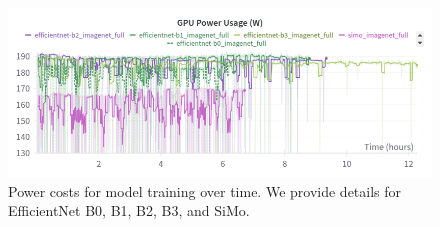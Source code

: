 





\begin{figure}
    \centering
    \includegraphics[width=0.95\linewidth]{figures/wattage-graph.png}
    \vspace{-0.3cm}
    \caption{Power costs for model training over time. We provide details for EfficientNet B0, B1, B2, B3, and SiMo.}
    \label{fig:experiment:power-costs}
\end{figure}

